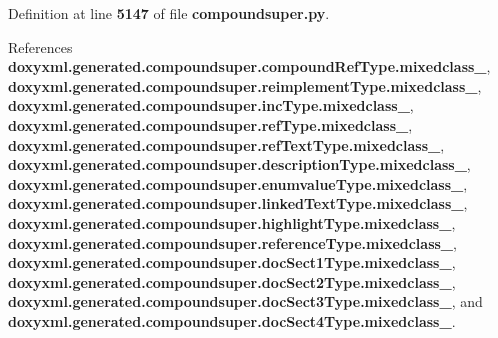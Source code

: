 Definition at line {\bf 5147} of file {\bf compoundsuper.\+py}.



References {\bf doxyxml.\+generated.\+compoundsuper.\+compound\+Ref\+Type.\+mixedclass\+\_\+}, {\bf doxyxml.\+generated.\+compoundsuper.\+reimplement\+Type.\+mixedclass\+\_\+}, {\bf doxyxml.\+generated.\+compoundsuper.\+inc\+Type.\+mixedclass\+\_\+}, {\bf doxyxml.\+generated.\+compoundsuper.\+ref\+Type.\+mixedclass\+\_\+}, {\bf doxyxml.\+generated.\+compoundsuper.\+ref\+Text\+Type.\+mixedclass\+\_\+}, {\bf doxyxml.\+generated.\+compoundsuper.\+description\+Type.\+mixedclass\+\_\+}, {\bf doxyxml.\+generated.\+compoundsuper.\+enumvalue\+Type.\+mixedclass\+\_\+}, {\bf doxyxml.\+generated.\+compoundsuper.\+linked\+Text\+Type.\+mixedclass\+\_\+}, {\bf doxyxml.\+generated.\+compoundsuper.\+highlight\+Type.\+mixedclass\+\_\+}, {\bf doxyxml.\+generated.\+compoundsuper.\+reference\+Type.\+mixedclass\+\_\+}, {\bf doxyxml.\+generated.\+compoundsuper.\+doc\+Sect1\+Type.\+mixedclass\+\_\+}, {\bf doxyxml.\+generated.\+compoundsuper.\+doc\+Sect2\+Type.\+mixedclass\+\_\+}, {\bf doxyxml.\+generated.\+compoundsuper.\+doc\+Sect3\+Type.\+mixedclass\+\_\+}, and {\bf doxyxml.\+generated.\+compoundsuper.\+doc\+Sect4\+Type.\+mixedclass\+\_\+}.



